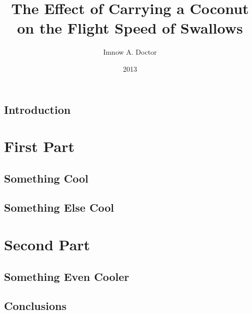 \documentclass[12pt,letterpaper,numbers,oneside]{memoir}
\title{The Effect of Carrying a Coconut on the Flight Speed of Swallows}
\author{Imnow A. Doctor}
\date{2013}
\begin{document}

\ifdef{\ShortenThesis}{
}{
  
}


\chapter{Introduction}
\lipsum

\part{First Part}
\chapter{Something Cool}
\lipsum

\chapter{Something Else Cool}
\lipsum

\part{Second Part}
\chapter{Something Even Cooler}
\lipsum

\chapter{Conclusions}
\lipsum

% 

%
%
\end{document}
